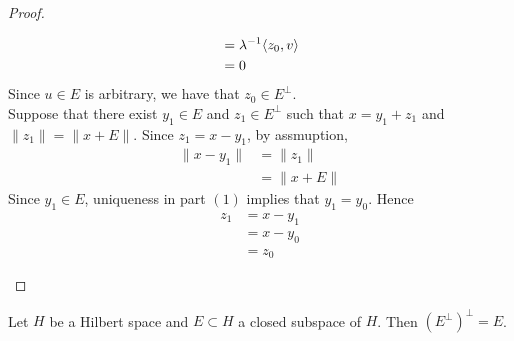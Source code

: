 \documentclass{book}
\begin{document}
\begin{proof}
\begin{enumerate}
\begin{itemize}
\begin{align*}
				& = \lambda^{-1} \langle z_0, v \rangle \\
				& = 0
			\end{align*} 
			Since $u \in E$ is arbitrary, we have that $z_0 \in E^{\perp}$. 
			 \\
			Suppose that there exist $y_1 \in E$ and $z_1 \in E^{\perp}$ such that $x = y_1 + z_1$ and $\|z_1\| = \|x+E\|$. Since $z_1 = x - y_1$, by assmuption, 
			\begin{align*}
				\|x - y_1\| 
				& = \|z_1\| \\
				& = \|x+E\|
			\end{align*}
			Since $y_1 \in E$, uniqueness in part $(1)$ implies that $y_1 = y_0$. Hence 
			\begin{align*}
				z_1
				& = x - y_1 \\
				& = x - y_0 \\
				& = z_0
			\end{align*}
		\end{itemize}
	\end{enumerate}
\end{proof}

\begin{ex}
	Let $H$ be a Hilbert space and $E \subset H$ a closed subspace of $H$. Then $(E^{\perp})^{\perp} = E$. 
\end{ex}
\end{document}
